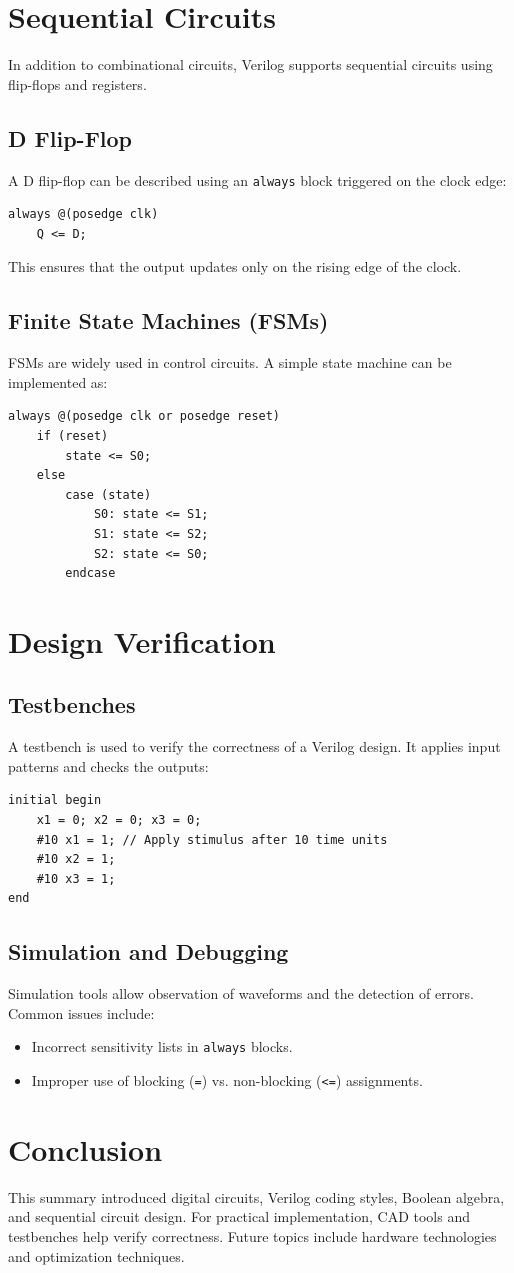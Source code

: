 \documentclass[twocolumn]{article}
\begin{document}
\section{Sequential Circuits}
In addition to combinational circuits, Verilog supports sequential circuits using flip-flops and registers.

\subsection{D Flip-Flop}
A D flip-flop can be described using an \texttt{always} block triggered on the clock edge:
\begin{lstlisting}
always @(posedge clk)
    Q <= D;
\end{lstlisting}
This ensures that the output updates only on the rising edge of the clock.

\subsection{Finite State Machines (FSMs)}
FSMs are widely used in control circuits. A simple state machine can be implemented as:
\begin{lstlisting}
always @(posedge clk or posedge reset)
    if (reset) 
        state <= S0;
    else 
        case (state)
            S0: state <= S1;
            S1: state <= S2;
            S2: state <= S0;
        endcase
\end{lstlisting}

\section{Design Verification}
\subsection{Testbenches}
A testbench is used to verify the correctness of a Verilog design. It applies input patterns and checks the outputs:
\begin{lstlisting}
initial begin
    x1 = 0; x2 = 0; x3 = 0;
    #10 x1 = 1; // Apply stimulus after 10 time units
    #10 x2 = 1;
    #10 x3 = 1;
end
\end{lstlisting}

\subsection{Simulation and Debugging}
Simulation tools allow observation of waveforms and the detection of errors. Common issues include:
\begin{itemize}
    \item Incorrect sensitivity lists in \texttt{always} blocks.
    \item Improper use of blocking (\texttt{=}) vs. non-blocking (\texttt{<=}) assignments.
\end{itemize}

\section{Conclusion}
This summary introduced digital circuits, Verilog coding styles, Boolean algebra, and sequential circuit design. For practical implementation, CAD tools and testbenches help verify correctness. Future topics include hardware technologies and optimization techniques.
\end{document}
